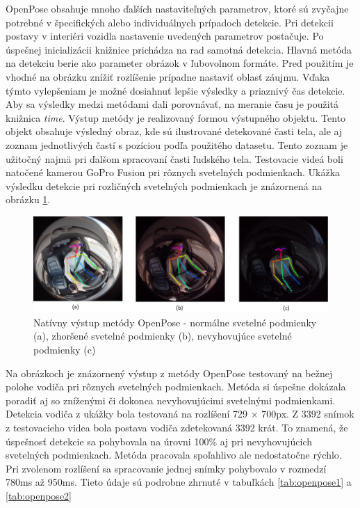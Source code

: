 \documentclass[slovak,master,dept460,male,cpp,cpdeclaration]{diploma}
\begin{document}
OpenPose obsahuje mnoho ďalších nastaviteľných parametrov, ktoré  sú zvyčajne potrebné v špecifických alebo individuálnych prípadoch detekcie. Pri detekcii postavy v interiéri vozidla nastavenie uvedených parametrov postačuje. Po úspešnej inicializácii knižnice prichádza na rad samotná detekcia.  Hlavná metóda na detekciu berie  ako parameter  obrázok v ľubovolnom formáte. Pred použitím je vhodné  na obrázku  znížiť rozlíšenie prípadne  nastaviť oblasť záujmu. Vďaka týmto vylepšeniam je možné dosiahnuť lepšie výsledky  a priaznivý čas detekcie. Aby sa výsledky  medzi metódami dali porovnávať, na meranie času je použitá knižnica \textit{time}. Výstup metódy je realizovaný formou výstupného objektu. Tento objekt obsahuje výsledný obraz, kde sú ilustrované detekované časti tela, ale aj zoznam jednotlivých častí s pozíciou podľa použitého datasetu. Tento zoznam je užitočný najmä pri  ďalšom spracovaní časti ľudského tela. Testovacie videá boli  natočené kamerou GoPro Fusion pri rôznych svetelných podmienkach. Ukážka výsledku detekcie pri rozličných  svetelných podmienkach je  znázornená na  obrázku \ref{fig:op_result}.

\begin{figure}[H]
	\centering
	\includegraphics[width=1\textwidth]{Figures/op_result.png}
	\caption{Natívny výstup metódy OpenPose - normálne svetelné podmienky (a), zhoršené svetelné podmienky (b), nevyhovujúce svetelné podmienky (c)}
	\label{fig:op_result}
\end{figure}

Na obrázkoch je znázornený výstup  z metódy OpenPose testovaný na bežnej polohe vodiča pri rôznych svetelných podmienkach. Metóda si úspešne dokázala poradiť aj so zníženými či dokonca nevyhovujúcimi svetelnými podmienkami. Detekcia vodiča z ukážky bola testovaná na rozlíšení 729 $\times$ 700px. Z 3392 snímok z testovacieho videa bola postava vodiča zdetekovaná  3392 krát. To znamená, že úspešnosť detekcie sa pohybovala na úrovni 100\% aj pri nevyhovujúcich svetelných podmienkach. Metóda pracovala spoľahlivo ale nedostatočne rýchlo. Pri zvolenom rozlíšení sa spracovanie jednej snímky pohybovalo v rozmedzí 780ms až 950ms. Tieto údaje sú podrobne zhrnuté v tabuľkách \ref{tab:openpose1} a \ref{tab:openpose2}
\end{document}

